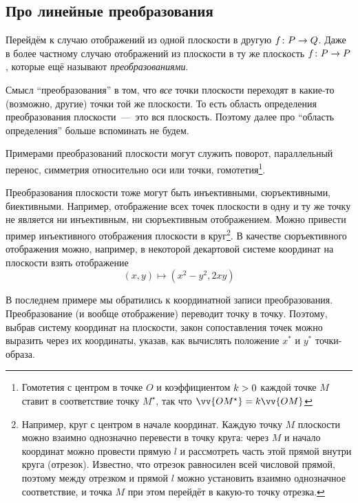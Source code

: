 \documentclass[a4paper,12pt]{article}
\begin{document}
  
  \subsection{Про линейные преобразования}
  
  Перейдём к случаю отображений из одной плоскости в другую $f\colon P \hm\to Q$.
  Даже в более частному случаю отображений из плоскости в ту же плоскость $f\colon P \hm\to P$, которые ещё называют \emph{преобразованиями}.
  
  \begin{remark}
    Смысл ``преобразования'' в том, что \emph{все} точки плоскости переходят в какие-то (возможно, другие) точки той же плоскости.
    То есть область определения преобразования плоскости~---~это вся плоскость.
    Поэтому далее про ``область определения'' больше вспоминать не будем.
  \end{remark}
  
  Примерами преобразований плоскости могут служить поворот, параллельный перенос, симметрия относительно оси или точки, гомотетия\footnote{Гомотетия с центром в точке $O$ и коэффициентом $k \hm> 0 $ каждой точке $M$ ставит в соответствие точку $M^\star$, так что $\vv{OM^\star} \hm= k\vv{OM}$}.
  
  Преобразования плоскости тоже могут быть инъективными, сюръективными, биективными.
  Например, отображение всех точек плоскости в одну и ту же точку не является ни инъективным, ни сюръективным отображением.
  Можно привести пример инъективного отображения плоскости в круг\footnote{
    Например, круг с центром в начале координат.
    Каждую точку $M$ плоскости можно взаимно однозначно перевести в точку круга: через $M$ и начало координат можно провести прямую $l$ и рассмотреть часть этой прямой внутри круга (отрезок).
    Известно, что отрезок равносилен всей числовой прямой, поэтому между отрезком и прямой $l$ можно установить взаимно однозначное соответствие, и точка $M$ при этом перейдёт в какую-то точку отрезка.
  }.
  В качестве сюръективного отображения можно, например, в некоторой декартовой системе координат на плоскости взять отображение
  \[
    (x, y) \mapsto \left(x^2 - y^2, 2xy\right)
  \]
  
  В последнем примере мы обратились к координатной записи преобразования.
  Преобразование (и вообще отображение) переводит точку в точку.
  Поэтому, выбрав систему координат на плоскости, закон сопоставления точек можно выразить через их координаты, указав, как вычислять положение $x^*$ и $y^*$ точки-образа.
  
\end{document}
